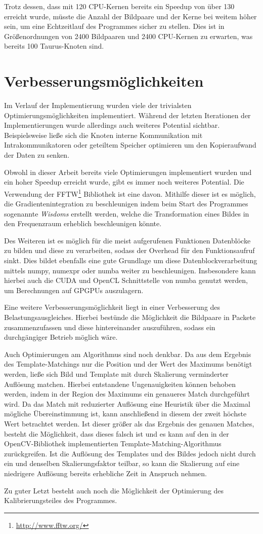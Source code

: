 Trotz dessen, dass mit 120 \gls{CPU}-Kernen bereits ein Speedup von über 130 erreicht wurde, müsste die Anzahl der Bildpaare und der Kerne bei weitem höher sein, um eine Echtzeitlauf des Programmes sicher zu stellen. Dies ist in Größenordnungen von 2400 Bildpaaren und 2400 \gls{CPU}-Kernen zu erwarten, was bereits 100 Taurus-Knoten sind. 

\section{Verbesserungsmöglichkeiten}

Im Verlauf der Implementierung wurden viele der trivialsten Optimierungsmöglichkeiten implementiert. Während der letzten Iterationen der Implementierungen wurde allerdings auch weiteres Potential sichtbar. Beispielsweise ließe sich die Knoten interne Kommunikation mit Intrakommunikatoren oder geteiltem Speicher optimieren um den Kopieraufwand der Daten zu senken. 

Obwohl in dieser Arbeit bereits viele Optimierungen implementiert wurden und ein hoher Speedup erreicht wurde, gibt es immer noch weiteres Potential. Die Verwendung der FFTW\footnote{\url{http://www.fftw.org/}} Bibliothek ist eine davon. Mithilfe dieser ist es möglich, die Gradientenintegration zu beschleunigen indem beim Start des Programmes sogenannte \textit{Wisdoms} erstellt werden, welche die Transformation eines Bildes in den Frequenzraum erheblich beschleunigen könnte. 

Des Weiteren ist es möglich für die meist aufgerufenen Funktionen Datenblöcke zu bilden und diese zu verarbeiten, sodass der Overhead für den Funktionsaufruf sinkt. Dies bildet ebenfalls eine gute Grundlage um diese Datenblockverarbeitung mittels numpy, numexpr oder numba weiter zu beschleunigen. Insbesondere kann hierbei auch die CUDA und OpenCL Schnittstelle von numba genutzt werden, um Berechnungen auf \glspl{GPGPU} auszulagern. 

Eine weitere Verbesserungsmöglichkeit liegt in einer Verbesserung des Belastungsausgleiches. Hierbei bestünde die Möglichkeit die Bildpaare in Packete zusammenzufassen und diese hintereinander auszuführen, sodass ein durchgängiger Betrieb möglich wäre. 

Auch Optimierungen am Algorithmus sind noch denkbar. Da aus dem Ergebnis des Template-Matchings nur die Position und der Wert des Maximums benötigt werden, ließe sich Bild und Template mit durch Skalierung verminderter Auflösung matchen. Hierbei entstandene Ungenauigkeiten können behoben werden, indem in der Region des Maximums ein genaueres Match durchgeführt wird. Da das Match mit reduzierter Auflösung eine Heuristik über die Maximal mögliche Übereinstimmung ist, kann anschließend in diesem der zweit höchste Wert betrachtet werden. Ist dieser größer als das Ergebnis des genauen Matches, besteht die Möglichkeit, dass dieses falsch ist und es kann auf den in der OpenCV-Bibliothek implementierten Template-Matching-Algorithmus zurückgreifen. Ist die Auflösung des Templates und des Bildes jedoch nicht durch ein und denselben Skalierungsfaktor teilbar, so kann die Skalierung auf eine niedrigere Auflösung bereits erhebliche Zeit in Anspruch nehmen. 

Zu guter Letzt besteht auch noch die Möglichkeit der Optimierung des Kalibrierungsteiles des Programmes. 